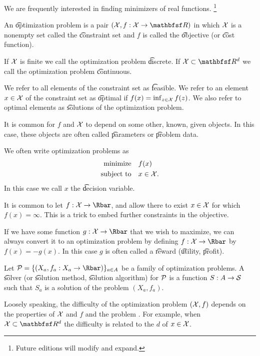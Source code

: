 

We are frequently interested in finding minimizers of real functions.
  \ifhmode\unskip\fi\footnote{
Future editions will modify and expand.
  }


An \t{optimization problem} is a pair $(\CX, f: \CX \to \R)$ in which $\mathcal{X}$ is a nonempty set called the \t{constraint set} and $f$ is called the \t{objective} (or \t{cost function}).

If $\mathcal{X}$ is finite we call the optimization problem \t{discrete}.
If $\CX \subset \R^d$ we call the optimization problem \t{continuous}.

We refer to all elements of the constraint set as \t{feasible}.
We refer to an element $x \in \mathcal{X}$ of the constraint set as \t{optimal} if $f(x) = \inf_{z \in \mathcal{X}}f(z)$.
We also refer to optimal elements as \t{solutions} of the optimization problem.

It is common for $f$ and $\mathcal{X}$ to depend on some other, known, given objects.
In this case, these objects are often called \t{parameters} or \t{problem data}.


We often write optimization problems as
  \[
\begin{aligned}
\text{minimize}\quad & f(x) \\
\text{subject to}\quad & x \in \mathcal{X}.
\end{aligned}
  \]
In this case we call $x$ the \t{decision variable}.


It is common to let $f: \CX \to \Rbar$, and allow there to exist $x \in \mathcal{X}$ for which $f(x) = \infty$.
This is a trick to embed further constraints in the objective.


If we have some function $g: \CX \to \Rbar$ that we wish to maximize, we can always convert it to an optimization problem by defining $f: \CX \to \Rbar$ by $f(x) = -g(x)$.
In this case $g$ is often called a \t{reward} (\t{utility}, \t{profit}).


Let $\CP = \set{(X_a, f_a: X_a \to \Rbar)}_{a \in A}$ be a family of optimization problems.
A \t{solver} (or \t{solution method}, \t{solution algorithm}) for $\mathcal{P}$ is a function $S: A \to \mathcal{S}$ such that $S_a$ is a solution of the problem $(X_a, f_a)$.

Loosely speaking, the difficulty of  the optimization problem $(\mathcal{X}, f)$ depends on the properties of $\mathcal{X}$ and $f$ and the problem .
For example, when $\CX \subset \R^d$ the difficulty is related to the  $d$ of $x \in \mathcal{X}$.

